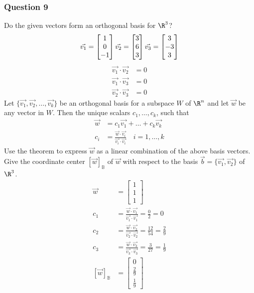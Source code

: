 \documentclass{math}
\begin{document}
\subsubsection*{Question 9}
Do the given vectors form an orthogonal basis for \( \R^3 \)?
\[ \vec{v_1} = \begin{bmatrix}1 \\ 0 \\ -1\end{bmatrix} \\
  \vec{v_2} = \begin{bmatrix}3 \\ 6 \\ 3\end{bmatrix} \\
  \vec{v_3} = \begin{bmatrix}3 \\ -3 \\ 3\end{bmatrix} \]
\begin{align*}
  \vec{v_1}\cdot\vec{v_2} &= 0 \\
  \vec{v_1}\cdot\vec{v_3} &= 0 \\
  \vec{v_2}\cdot\vec{v_3} &= 0
\end{align*}
Let \( \{\vec{v_1},\vec{v_2},\dots,\vec{v_k}\} \) be an orthogonal basis for a
subspace \( W \) of \( \R^n \) and let \( \vec{w} \) be any vector in \( W \).
Then the unique scalars \( c_1,\dots,c_k \), such that
\begin{align*}
  \vec{w} &= c_1\vec{v_1}+\dots+c_k\vec{v_k} \\
  c_i &= \frac{\vec{w}\cdot\vec{v_i}}{\vec{v_i}\cdot\vec{v_i}} \quad
    i = 1,\dots,k
\end{align*}
Use the theorem to express \( \vec{w} \) as a linear combination of the above
basis vectors. Give the coordinate center \( [\vec{w}]_{\mathbb{B}} \) of
\( \vec{w} \) with respect to the basis \( \vec{b} = \{\vec{v_1},\vec{v_2}\} \)
of \( \R^3 \).
\begin{align*}
  \vec{w} &= \begin{bmatrix}1 \\ 1 \\ 1\end{bmatrix} \\
  c_1 &= \frac{\vec{w}\cdot\vec{v_1}}{\vec{v_1}\cdot\vec{v_1}} =
    \frac{0}{2} = 0 \\
  c_2 &= \frac{\vec{w}\cdot\vec{v_2}}{\vec{v_2}\cdot\vec{v_2}} =
    \frac{12}{54} = \frac{2}{9} \\
  c_3 &= \frac{\vec{w}\cdot\vec{v_3}}{\vec{v_3}\cdot\vec{v_3}} =
    \frac{3}{27} = \frac{1}{9} \\
  [\vec{w}]_{\mathbb{B}} &= \begin{bmatrix}
    0 \\ \frac{2}{9} \\ \frac{1}{9}
  \end{bmatrix}
\end{align*}
\end{document}
